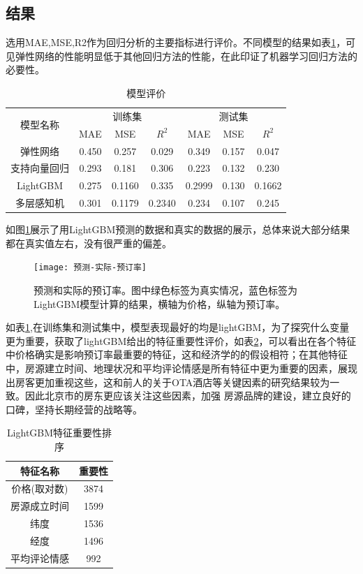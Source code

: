 \documentclass{article}
\begin{document}
\begin{multicols}{2}
\section{结果}
选用MAE,MSE,R2作为回归分析的主要指标进行评价。不同模型的结果如表\ref{tab:模型评价}，可见弹性网络的性能明显低于其他回归方法的性能，在此印证了机器学习回归方法的必要性。
\begin{table}[H]
	\centering
	\begin{tabular}{|c|ccc|ccc|}
		\hline
		\multirow{2}{*}{模型名称} &  \multicolumn{3}{c|}{训练集}       &  \multicolumn{3}{c|}{测试集}  \\
		\cline{2-7}
			&      MAE  &  MSE     &    $R^2$   &   MAE     &   MSE    &  $R^2$\\ 
		\hline 
		弹性网络 & 0.450 & 0.257 & 0.029 & 0.349 & 0.157& 0.047 \\	  \hline 
		支持向量回归 & 0.293 & 0.181 & 0.306 & 0.223&0.132 & 0.230  \\	 \hline 
		LightGBM & 0.275 & 0.1160 & 0.335 & 0.2999 & 0.130 & 0.1662 \\	 \hline 
		多层感知机 & 0.301 & 0.1179 & 0.2340 & 0.234 & 0.107 & 0.245\\	 \hline 
	\end{tabular}
\caption{模型评价}
\label{tab:模型评价}
\end{table}
\par 如图\ref{fig:预测-真实预订率}展示了用LightGBM预测的数据和真实的数据的展示，总体来说大部分结果都在真实值左右，没有很严重的偏差。
\begin{figure}[H]
	\centering
	\texttt{[image: 预测-实际-预订率]}
	\caption{预测和实际的预订率。图中绿色标签为真实情况，蓝色标签为LightGBM模型计算的结果，横轴为价格，纵轴为预订率。}
	\label{fig:预测-真实预订率}
\end{figure}
\par 如表\ref{tab:模型评价},在训练集和测试集中，模型表现最好的均是lightGBM，为了探究什么变量更为重要，获取了lightGBM给出的特征重要性评价，如表\ref{tab:特征重要性}，可以看出在各个特征中价格确实是影响预订率最重要的特征，这和经济学的的假设相符；在其他特征中，房源建立时间、地理状况和平均评论情感是所有特征中更为重要的因素，展现出房客更加重视这些，这和前人的关于OTA酒店等关键因素的研究结果较为一致。因此北京市的房东更应该关注这些因素，加强 房源品牌的建设，建立良好的口碑，坚持长期经营的战略等。
\begin{table}[!htpb]
	\centering
	\begin{tabular}{c|c}
		\hline 
		特征名称  & 重要性\\\hline
		价格(取对数) & 3874 \\
		房源成立时间 & 1599 \\
		纬度 & 1536 \\
		经度 & 1496\\
		平均评论情感 & 992 \\\hline 
	\end{tabular}
\caption{LightGBM特征重要性排序}
\label{tab:特征重要性}
\end{table}

\end{multicols}
\end{document}
